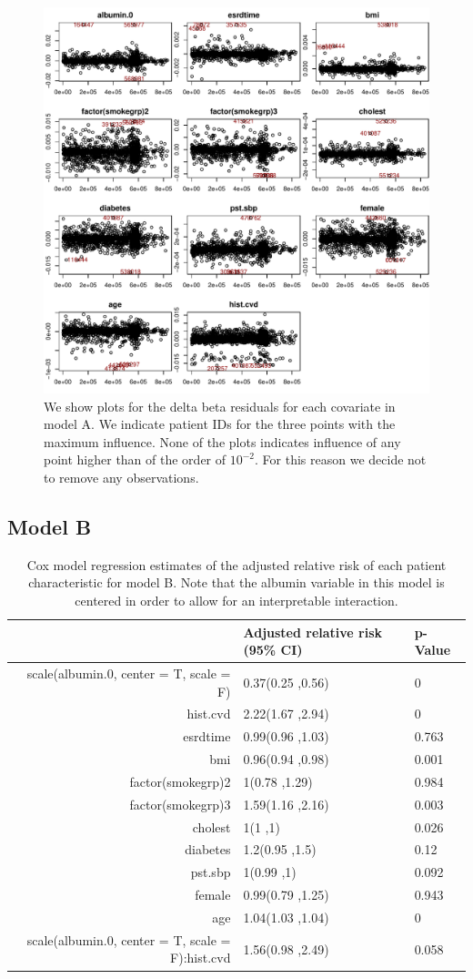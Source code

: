 \documentclass[paper=a4, fontsize=11pt]{scrartcl} %
\numberwithin{equation}{section} %
\numberwithin{figure}{section} %
\numberwithin{table}{section} %
\begin{document}
\begin{figure}[H]
\centering
\includegraphics[width=.8\textwidth]{plots/modela_dfbeta.pdf}
\caption{We show plots for the delta beta residuals for each covariate in model A. We indicate patient IDs for the three points with the maximum influence. None of the plots indicates influence of any point higher than of the order of $10^{-2}$. For this reason we decide not to remove any observations.}
\label{fig:modela_dfbeta}
\end{figure}

\subsection{Model B}
\begin{table}[H]
\centering
\begin{tabular}{rll}
  \hline
 & Adjusted relative risk (95\% CI) & p-Value \\ 
  \hline
scale(albumin.0, center = T, scale = F) & 0.37(0.25 ,0.56) & 0 \\ 
  hist.cvd & 2.22(1.67 ,2.94) & 0 \\ 
  esrdtime & 0.99(0.96 ,1.03) & 0.763 \\ 
  bmi & 0.96(0.94 ,0.98) & 0.001 \\ 
  factor(smokegrp)2 & 1(0.78 ,1.29) & 0.984 \\ 
  factor(smokegrp)3 & 1.59(1.16 ,2.16) & 0.003 \\ 
  cholest & 1(1 ,1) & 0.026 \\ 
  diabetes & 1.2(0.95 ,1.5) & 0.12 \\ 
  pst.sbp & 1(0.99 ,1) & 0.092 \\ 
  female & 0.99(0.79 ,1.25) & 0.943 \\ 
  age & 1.04(1.03 ,1.04) & 0 \\ 
  scale(albumin.0, center = T, scale = F):hist.cvd & 1.56(0.98 ,2.49) & 0.058 \\ 
   \hline
\end{tabular}
\caption{Cox model regression estimates of the adjusted relative risk of each patient characteristic for model B. Note that the albumin variable in this model is centered in order to allow for an interpretable interaction.}
\label{tab:model_b}
\end{table}
\end{document}
